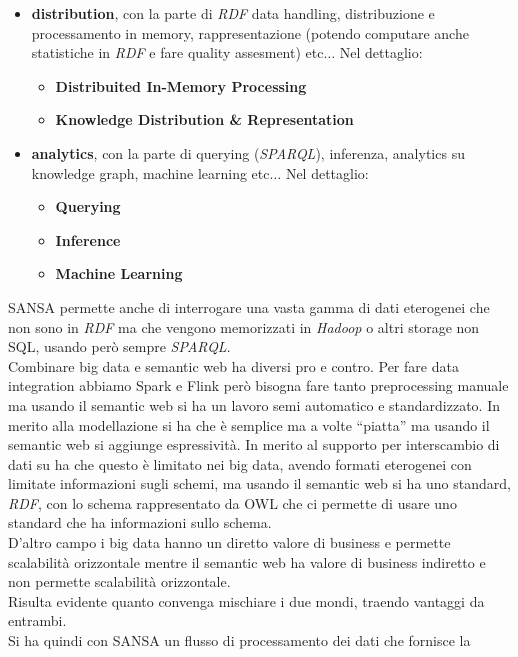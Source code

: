 \documentclass[a4paper,12pt, oneside]{book}
\begin{document}
\begin{itemize}
  \item \textbf{distribution}, con la parte di \textit{RDF} data handling,
  distribuzione e processamento in memory, rappresentazione (potendo computare
  anche statistiche in \textit{RDF} e fare quality assesment) etc$\ldots$ Nel
  dettaglio:
  \begin{itemize}
    \item \textbf{Distribuited In-Memory Processing}
    \item \textbf{Knowledge Distribution \& Representation}
  \end{itemize}
  \item \textbf{analytics}, con la parte di querying (\textit{SPARQL}),
  inferenza, analytics su knowledge graph, machine learning etc$\ldots$ Nel
  dettaglio:
  \begin{itemize}
    \item \textbf{Querying}
    \item \textbf{Inference}
    \item \textbf{Machine Learning}
  \end{itemize}
\end{itemize}
SANSA permette anche di interrogare una vasta gamma di dati eterogenei che non
sono in \textit{RDF} ma che vengono memorizzati in \textit{Hadoop} o altri
storage non SQL, usando però sempre \textit{SPARQL}.\\
Combinare big data e semantic web ha diversi pro e contro. Per fare data
integration abbiamo Spark e Flink però bisogna fare tanto preprocessing manuale
ma usando il semantic web si ha un lavoro semi automatico e standardizzato. In
merito alla modellazione si ha che è semplice ma a volte ``piatta'' ma usando il
semantic web si aggiunge espressività. In merito al supporto per interscambio di
dati su ha che questo è limitato nei big data, avendo formati eterogenei con
limitate informazioni sugli schemi, ma usando il semantic web si ha uno
standard, \textit{RDF}, con lo schema rappresentato da OWL che ci permette di
usare uno standard che ha informazioni sullo schema.\\
D'altro campo i big data hanno un diretto valore di business e permette
scalabilità orizzontale mentre il semantic web ha valore di business indiretto e
non permette scalabilità orizzontale.\\
Risulta evidente quanto convenga mischiare i due mondi, traendo vantaggi da
entrambi. \\
Si ha quindi con SANSA un flusso di processamento dei dati che fornisce la
\end{document}
